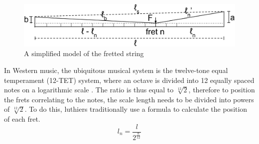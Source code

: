 \begin{figure}[!htbp]
    \includegraphics[width=\textwidth]{./ee/fig3.png}
    \caption{A simplified model of the fretted string}\label{fig2}
\end{figure} 
In Western music, the ubiquitous musical system is the twelve-tone equal temperament (12-TET) system, where an octave is divided into 12 equally spaced notes on a logarithmic scale \cite{yuval}. The ratio is thus equal to $\sqrt[12]{2}$, therefore to position the frets correlating to the notes, the scale length needs to be divided into powers of $\sqrt[12]{2}$. To do this, luthiers traditionally use a formula to calculate the position of each fret. \cite{eqn6}
\begin{equation}\label{eqn2}
    l_n=\frac{l}{2^\frac{n}{12}}
\end{equation}